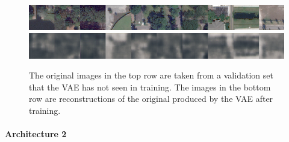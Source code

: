 \begin{figure}[H]
    \centering
    \includegraphics[width=\textwidth]
    {images/figures/experiments_architecture/inputsKernel3adjusted2x2x256_dim1024.png}
    \includegraphics[width=\textwidth]
    {images/figures/experiments_architecture/reconstructionsKernel3adjusted2x2x256_dim1024.png}
    \caption{The original images in the top row are taken from a validation set
    that the VAE has not seen in training.
    The images in the bottom row are reconstructions of the original produced by the VAE after training.}
\end{figure}




\paragraph{Architecture 2}

